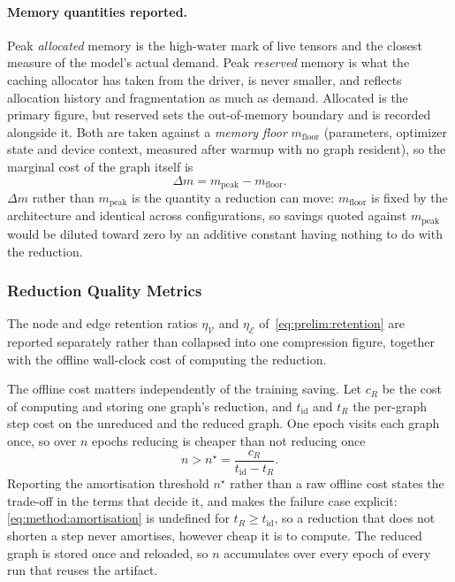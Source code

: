 \paragraph{Memory quantities reported.}
Peak \emph{allocated} memory is the high-water mark of live tensors and the closest measure
of the model's actual demand. Peak \emph{reserved} memory is what the caching allocator has
taken from the driver, is never smaller, and reflects allocation history and fragmentation
as much as demand. Allocated is the primary figure, but reserved sets the out-of-memory
boundary and is recorded alongside it. Both are taken against a \emph{memory floor}
$m_{\mathrm{floor}}$ (parameters, optimizer state and device context, measured after warmup
with no graph resident), so the marginal cost of the graph itself is
\begin{equation}
    \Delta m = m_{\mathrm{peak}} - m_{\mathrm{floor}}.
    \label{eq:method:marginal-memory}
\end{equation}
$\Delta m$ rather than $m_{\mathrm{peak}}$ is the quantity a reduction can move:
$m_{\mathrm{floor}}$ is fixed by the architecture and identical across configurations, so
savings quoted against $m_{\mathrm{peak}}$ would be diluted toward zero by an additive
constant having nothing to do with the reduction.

\subsubsection{Reduction Quality Metrics}
\label{sec:method:experiment:metrics:reduction}
The node and edge retention ratios $\eta_{\mathcal{V}}$ and $\eta_{\mathcal{E}}$
of~\eqref{eq:prelim:retention} are reported separately rather than collapsed into one
compression figure, together with the offline wall-clock cost of computing the reduction.

The offline cost matters independently of the training saving. Let $c_R$ be the cost of
computing and storing one graph's reduction, and $t_{\operatorname{id}}$ and $t_R$ the
per-graph step cost on the unreduced and the reduced graph. One epoch visits each graph
once, so over $n$ epochs reducing is cheaper than not reducing once
\begin{equation}
    n > n^{\star} = \frac{c_R}{t_{\operatorname{id}} - t_R}.
    \label{eq:method:amortisation}
\end{equation}
Reporting the amortisation threshold $n^{\star}$ rather than a raw offline cost states the
trade-off in the terms that decide it, and makes the failure case explicit:
\eqref{eq:method:amortisation} is undefined for $t_R \geq t_{\operatorname{id}}$, so a
reduction that does not shorten a step never amortises, however cheap it is to compute.
The reduced graph is stored once and reloaded, so $n$ accumulates over every epoch of every
run that reuses the artifact.

